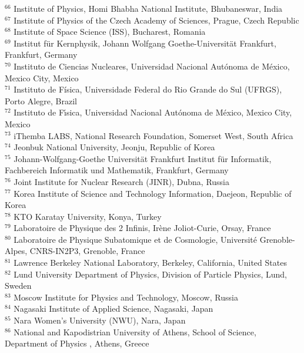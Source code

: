 \begin{flushleft}
$^{66}$ Institute of Physics, Homi Bhabha National Institute, Bhubaneswar, India\\
$^{67}$ Institute of Physics of the Czech Academy of Sciences, Prague, Czech Republic\\
$^{68}$ Institute of Space Science (ISS), Bucharest, Romania\\
$^{69}$ Institut f\"{u}r Kernphysik, Johann Wolfgang Goethe-Universit\"{a}t Frankfurt, Frankfurt, Germany\\
$^{70}$ Instituto de Ciencias Nucleares, Universidad Nacional Aut\'{o}noma de M\'{e}xico, Mexico City, Mexico\\
$^{71}$ Instituto de F\'{i}sica, Universidade Federal do Rio Grande do Sul (UFRGS), Porto Alegre, Brazil\\
$^{72}$ Instituto de F\'{\i}sica, Universidad Nacional Aut\'{o}noma de M\'{e}xico, Mexico City, Mexico\\
$^{73}$ iThemba LABS, National Research Foundation, Somerset West, South Africa\\
$^{74}$ Jeonbuk National University, Jeonju, Republic of Korea\\
$^{75}$ Johann-Wolfgang-Goethe Universit\"{a}t Frankfurt Institut f\"{u}r Informatik, Fachbereich Informatik und Mathematik, Frankfurt, Germany\\
$^{76}$ Joint Institute for Nuclear Research (JINR), Dubna, Russia\\
$^{77}$ Korea Institute of Science and Technology Information, Daejeon, Republic of Korea\\
$^{78}$ KTO Karatay University, Konya, Turkey\\
$^{79}$ Laboratoire de Physique des 2 Infinis, Ir\`{e}ne Joliot-Curie, Orsay, France\\
$^{80}$ Laboratoire de Physique Subatomique et de Cosmologie, Universit\'{e} Grenoble-Alpes, CNRS-IN2P3, Grenoble, France\\
$^{81}$ Lawrence Berkeley National Laboratory, Berkeley, California, United States\\
$^{82}$ Lund University Department of Physics, Division of Particle Physics, Lund, Sweden\\
$^{83}$ Moscow Institute for Physics and Technology, Moscow, Russia\\
$^{84}$ Nagasaki Institute of Applied Science, Nagasaki, Japan\\
$^{85}$ Nara Women{'}s University (NWU), Nara, Japan\\
$^{86}$ National and Kapodistrian University of Athens, School of Science, Department of Physics , Athens, Greece\\

\end{flushleft}
